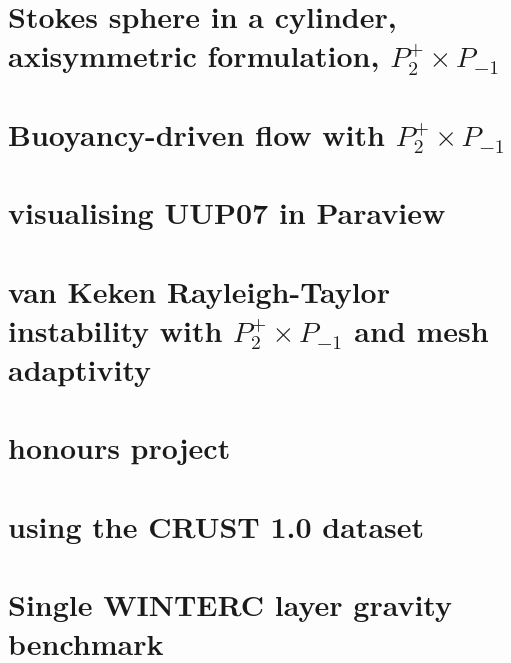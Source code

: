 \documentclass[a4paper,11pt]{report}
\begin{document}
\chapter{Stokes sphere in a cylinder, axisymmetric formulation, $P_2^+\times P_{-1}$ \label{f92}} %

\chapter{Buoyancy-driven flow with $P_2^+\times P_{-1}$ \label{f93}} %

\chapter{visualising UUP07 in Paraview \label{f94}} %

\chapter{van Keken \etal Rayleigh-Taylor instability with $P_2^+\times P_{-1}$ and mesh adaptivity \label{f95}}

\chapter{honours project \label{f96}} %

\chapter{using the CRUST 1.0 dataset \label{f97}} %

\chapter{Single WINTERC layer gravity benchmark \label{f98}} %
\end{document}
